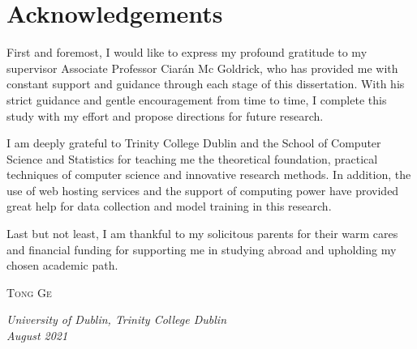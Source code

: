 \chapter{Acknowledgements}
{
\linespread{1.3}
\selectfont
First and foremost, I would like to express my profound gratitude to my supervisor Associate Professor Ciarán Mc Goldrick, who has provided me with constant support and guidance through each stage of this dissertation. 
With his strict guidance and gentle encouragement from time to time, I complete this study with my effort and propose directions for future research.

I am deeply grateful to Trinity College Dublin and the School of Computer Science and Statistics for teaching me the theoretical foundation, practical techniques of computer science and innovative research methods. 
In addition, the use of web hosting services and the support of computing power have provided great help for data collection and model training in this research.

Last but not least, I am thankful to my solicitous parents for their warm cares and financial funding for supporting me in studying abroad and upholding my chosen academic path.

\vspace{1.2cm}
\raggedleft \textsc{\large Tong Ge} \\[10mm]

\raggedright \textit{University of Dublin, Trinity College Dublin \\
August 2021}
}
\clearpage